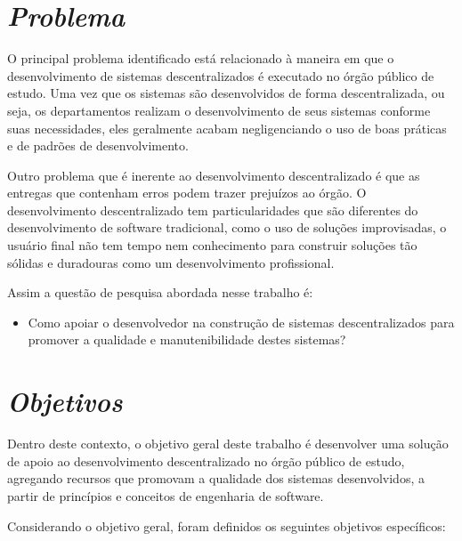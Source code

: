 \section{\textit{Problema}}

O principal problema identificado está relacionado à maneira em que o desenvolvimento de sistemas descentralizados é executado no órgão público de estudo. Uma vez que os sistemas são desenvolvidos de forma descentralizada, ou seja, os departamentos realizam o desenvolvimento de seus sistemas conforme suas necessidades, eles geralmente acabam negligenciando o uso de boas práticas e de padrões de desenvolvimento.

Outro problema que é inerente ao desenvolvimento descentralizado é que as entregas que contenham erros podem trazer prejuízos ao órgão. O desenvolvimento descentralizado tem particularidades que são diferentes do desenvolvimento de software tradicional, como o uso de soluções improvisadas, o usuário final não tem tempo nem conhecimento para construir soluções tão sólidas e duradouras como um desenvolvimento profissional.

Assim a questão de pesquisa abordada nesse trabalho é:
\begin{itemize}
\item Como apoiar o desenvolvedor na construção de sistemas descentralizados para promover a qualidade e manutenibilidade destes sistemas?
\end{itemize}

\section{\textit{Objetivos}}

Dentro deste contexto, o objetivo geral deste trabalho é desenvolver uma solução de apoio ao desenvolvimento descentralizado no órgão público de estudo, agregando recursos que promovam a qualidade dos sistemas desenvolvidos, a partir de princípios e conceitos de engenharia de software.

Considerando o objetivo geral, foram definidos os seguintes objetivos específicos:

